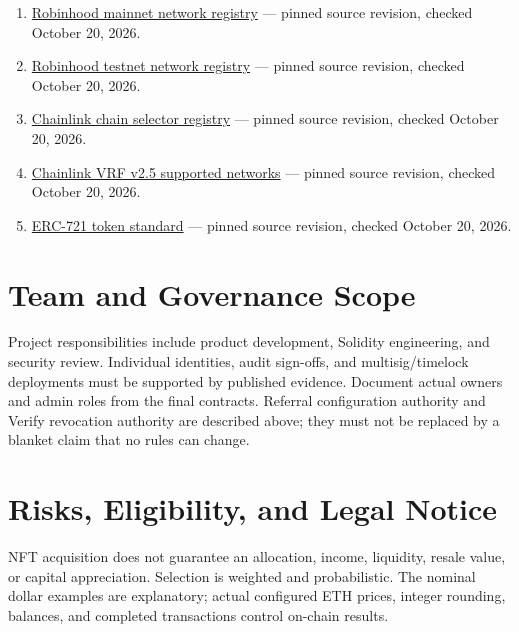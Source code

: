 \documentclass[
  10pt,
  letterpaper,
]{article}
\providecommand{\tightlist}{%
  \setlength{\itemsep}{0pt}\setlength{\parskip}{0pt}}
\begin{document}
\begin{enumerate}
\def\labelenumi{\arabic{enumi}.}
\tightlist
\item
  \href{https://raw.githubusercontent.com/ethereum-lists/chains/4a2f1946a185a3e218f7f0b16a9d2f3746c2b40b/_data/chains/eip155-4663.json}{Robinhood
  mainnet network registry} --- pinned source revision, checked October
  20, 2026.
\item
  \href{https://raw.githubusercontent.com/ethereum-lists/chains/4a2f1946a185a3e218f7f0b16a9d2f3746c2b40b/_data/chains/eip155-46630.json}{Robinhood
  testnet network registry} --- pinned source revision, checked October
  20, 2026.
\item
  \href{https://raw.githubusercontent.com/smartcontractkit/chain-selectors/9a0d5970fd1edad07dc066f67f41a9dceafae231/selectors.yml}{Chainlink
  chain selector registry} --- pinned source revision, checked October
  20, 2026.
\item
  \href{https://raw.githubusercontent.com/smartcontractkit/documentation/b368069a966afd6a4521af48eb2990af4ab2d75e/src/content/vrf/v2-5/supported-networks.mdx}{Chainlink
  VRF v2.5 supported networks} --- pinned source revision, checked
  October 20, 2026.
\item
  \href{https://raw.githubusercontent.com/ethereum/ercs/48dc87a2897c1d412d6df688c2d7df1229f2b30c/ERCS/erc-721.md}{ERC-721
  token standard} --- pinned source revision, checked October 20, 2026.
\end{enumerate}

\section{Team and Governance Scope}\label{team-and-governance-scope}

Project responsibilities include product development, Solidity
engineering, and security review. Individual identities, audit
sign-offs, and multisig/timelock deployments must be supported by
published evidence. Document actual owners and admin roles from the
final contracts. Referral configuration authority and Verify revocation
authority are described above; they must not be replaced by a blanket
claim that no rules can change.

\section{Risks, Eligibility, and Legal
Notice}\label{risks-eligibility-and-legal-notice}

NFT acquisition does not guarantee an allocation, income, liquidity,
resale value, or capital appreciation. Selection is weighted and
probabilistic. The nominal dollar examples are explanatory; actual
configured ETH prices, integer rounding, balances, and completed
transactions control on-chain results.
\end{document}

